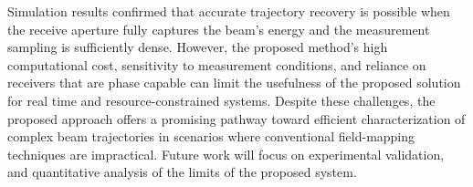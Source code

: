 \documentclass[11pt]{IEEEtran}
\begin{document}
Simulation results confirmed that accurate trajectory recovery is possible when the receive aperture fully captures the beam’s energy and the measurement sampling is sufficiently dense.
However, the proposed method’s high computational cost, sensitivity to measurement conditions, and reliance on receivers that are phase capable can limit the usefulness of the proposed solution for real time and resource-constrained systems.
Despite these challenges, the proposed approach offers a promising pathway toward efficient characterization of complex beam trajectories in scenarios where conventional field-mapping techniques are impractical.
Future work will focus on experimental validation, and quantitative analysis of the limits of the proposed system.







%
%
%





\end{document}
